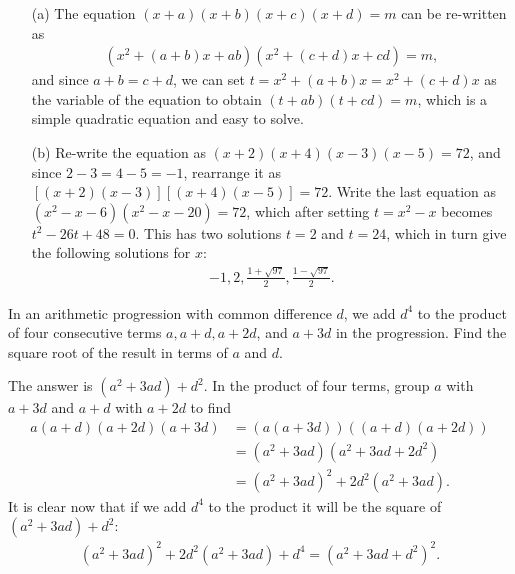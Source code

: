 \documentclass[12pt,a4paper]{memoir}
\theoremstyle{definition}
\begin{document}
\begin{solution}[name=Solution by Parviz Shahriari]
	\begin{itemize}
		\item[(a)] The equation $(x+a)(x+b)(x+c)(x+d)=m$ can be re-written as
		\begin{align*}
			(x^2+(a+b)x+ab)(x^2+(c+d)x+cd)=m,
		\end{align*}
		and since $a+b=c+d$, we can set $t = x^2+(a+b)x = x^2 + (c+d)x$ as the variable of the equation to obtain $(t+ab)(t+cd)=m$, which is a simple quadratic equation and easy to solve.
		\item[(b)] Re-write the equation as $(x+2)(x+4)(x-3)(x-5)=72$, and since $2-3=4-5=-1$, rearrange it as $\left[(x+2)(x-3)\right] \left[(x+4)(x-5)\right]=72$. Write the last equation as $(x^2-x-6)(x^2-x-20)=72$, which after setting $t=x^2-x$ becomes $t^2-26t+48=0$. This has two solutions $t=2$ and $t=24$, which in turn give the following solutions for $x$:
		\begin{align*}
			-1, 2, \frac{1+\sqrt{97}}{2}, \frac{1-\sqrt{97}}{2}.
		\end{align*}
	\end{itemize}
\end{solution}


\begin{tcolorbox}
	\begin{question}
		In an arithmetic progression with common difference $d$, we add $d^4$ to the product of four consecutive terms $a,a+d,a+2d$, and $a+3d$ in the progression. Find the square root of the result in terms of $a$ and $d$.
	\end{question}
\end{tcolorbox}

\begin{solution}[name=Solution by Parviz Shahriari]
	The answer is $\left(a^2 + 3ad\right)+d^2$. In the product of four terms, group $a$ with $a+3d$ and $a+d$ with $a+2d$ to find
	\begin{align*}
		a(a+d)(a+2d)(a+3d) &= \left(a(a+3d)\right) \left((a+d)(a+2d)\right)\\
		&= \left(a^2 + 3ad\right)\left(a^2+3ad+2d^2\right)\\
		&= \left(a^2 + 3ad\right)^2 + 2d^2\left(a^2 + 3ad\right).
	\end{align*}
	It is clear now that if we add $d^4$ to the product it will be the square of $\left(a^2 + 3ad\right)+d^2$:
	\begin{align*}
		\left(a^2 + 3ad\right)^2 + 2d^2\left(a^2 + 3ad\right) + d^4 = \left(a^2 + 3ad+d^2\right)^2.
	\end{align*}
\end{solution}
\end{document}
